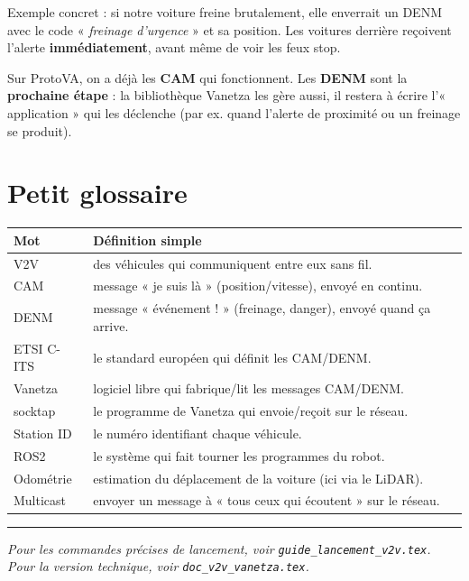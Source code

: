 \documentclass[a4paper,11pt]{article}
\begin{document}
\begin{info}
Exemple concret : si notre voiture freine brutalement, elle enverrait un DENM avec
le code « \emph{freinage d'urgence} » et sa position. Les voitures derrière
reçoivent l'alerte \textbf{immédiatement}, avant même de voir les feux stop.
\end{info}

\begin{cle}
Sur ProtoVA, on a déjà les \textbf{CAM} qui fonctionnent. Les \textbf{DENM} sont la
\textbf{prochaine étape} : la bibliothèque Vanetza les gère aussi, il restera à
écrire l'« application » qui les déclenche (par ex. quand l'alerte de proximité ou
un freinage se produit).
\end{cle}

\section{Petit glossaire}
\begin{tabularx}{\textwidth}{@{}l X@{}}
\toprule
\textbf{Mot} & \textbf{Définition simple} \\
\midrule
V2V & des véhicules qui communiquent entre eux sans fil. \\
CAM & message « je suis là » (position/vitesse), envoyé en continu. \\
DENM & message « événement ! » (freinage, danger), envoyé quand ça arrive. \\
ETSI C-ITS & le standard européen qui définit les CAM/DENM. \\
Vanetza & logiciel libre qui fabrique/lit les messages CAM/DENM. \\
socktap & le programme de Vanetza qui envoie/reçoit sur le réseau. \\
Station ID & le numéro identifiant chaque véhicule. \\
ROS2 & le système qui fait tourner les programmes du robot. \\
Odométrie & estimation du déplacement de la voiture (ici via le LiDAR). \\
Multicast & envoyer un message à « tous ceux qui écoutent » sur le réseau. \\
\bottomrule
\end{tabularx}

\vspace{6pt}\hrule
{\footnotesize\itshape Pour les commandes précises de lancement, voir
\texttt{guide\_lancement\_v2v.tex}. Pour la version technique, voir
\texttt{doc\_v2v\_vanetza.tex}.}
\end{document}
